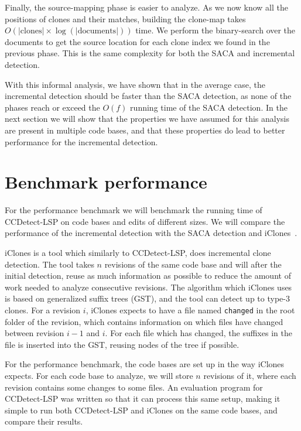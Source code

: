 Finally, the source-mapping phase is easier to analyze. As we now know all the positions
of clones and their matches, building the clone-map takes $O(\vert\text{clones}\vert
\times \log(\vert\text{documents}\vert))$ time. We perform the binary-search over the
documents to get the source location for each clone index we found in the previous phase.
This is the same complexity for both the SACA and incremental detection.

With this informal analysis, we have shown that in the average case, the incremental
detection should be faster than the SACA detection, as none of the phases reach or exceed
the $O(f)$ running time of the SACA detection. In the next section we will show that the
properties we have assumed for this analysis are present in multiple code bases, and that
these properties do lead to better performance for the incremental detection.

\section{Benchmark performance}

For the performance benchmark we will benchmark the running time of CCDetect-LSP on code
bases and edits of different sizes. We will compare the performance of the incremental
detection with the SACA detection and iClones~\cite{GodeIncrementalCloneDetection}.

iClones is a tool which similarly to CCDetect-LSP, does incremental clone detection. The
tool takes $n$ revisions of the same code base and will after the initial detection, reuse
as much information as possible to reduce the amount of work needed to analyze consecutive
revisions. The algorithm which iClones uses is based on generalized suffix trees (GST),
and the tool can detect up to type-3 clones. For a revision $i$, iClones expects to have a
file named \verb|changed| in the root folder of the revision, which contains information
on which files have changed between revision $i - 1$ and $i$. For each file which has
changed, the suffixes in the file is inserted into the GST, reusing nodes of the tree if
possible.

For the performance benchmark, the code bases are set up in the way iClones expects. For
each code base to analyze, we will store $n$ revisions of it, where each revision contains
some changes to some files. An evaluation program for CCDetect-LSP was written so that it
can process this same setup, making it simple to run both CCDetect-LSP and iClones on the
same code bases, and compare their results.

